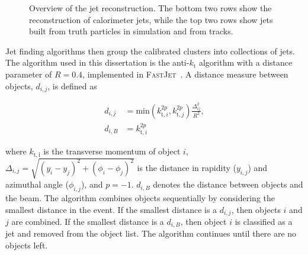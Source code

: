 \begin{figure}[htbp]
	\centering
	\caption{Overview of the jet reconstruction. The bottom two rows show the reconstruction of calorimeter jets, while the top two rows show jets built from truth particles in simulation and from tracks.}
	\label{fig:reco-jet-reconstruction-flowchart}
\end{figure}


Jet finding algorithms then group the calibrated clusters into collections of jets. The algorithm used in this dissertation is the anti-$k_{\mathrm{t}}$ algorithm with a distance parameter of $R=0.4$, implemented in \textsc{FastJet}~\cite{Cacciari:2008gp,Cacciari:2011ma}. A distance measure between objects, $d_{i,j}$, is defined as

\begin{align}
	d_{i,j} &= \mathrm{min}(k_{\mathrm{t}, i}^{2p}, k_{\mathrm{t}, j}^{2p}) \frac{\Delta_{ij}^2}{R^2}, \\
	d_{i,B} &= k_{\mathrm{t},i}^{2p}
\end{align}

where $k_{\mathrm{t,i}}$ is the transverse momentum of object $i$, $\Delta_{i,j}=\sqrt{(y_i-y_j)^2+(\phi_i-\phi_j)^2}$ is the distance in rapidity ($y_{i,j}$) and azimuthal angle ($\phi_{i,j}$), and $p=-1$. $d_{i,B}$ denotes the distance between objects and the beam. The algorithm combines objects sequentially by considering the smallest distance in the event. If the smallest distance is a $d_{i,j}$, then objects $i$ and $j$ are combined. If the smallest distance is a $d_{i,B}$, then object $i$ is classified as a jet and removed from the object list. The algorithm continues until there are no objects left. 

